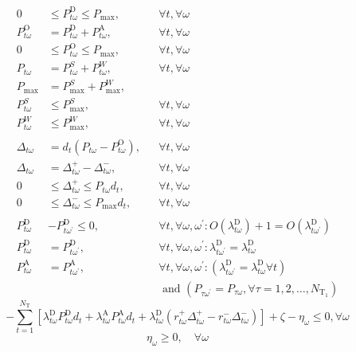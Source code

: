 \begin{align}
0 &\leq P_{t \omega}^{\mathrm{D}} \leq P_{\mathrm{max}}, &  &\forall t, \forall \omega \\
P_{t \omega}^{\mathrm{O}}&=P_{t \omega}^{\mathrm{D}}+P_{t \omega}^{\mathrm{A}},&  &\forall t, \forall \omega \\
0 &\leq P_{t \omega}^{\mathrm{O}} \leq P_{\max }, & & \forall t, \forall \omega \\
P_{t\omega}&= P_{t\omega}^S+P_{t\omega}^W, & &\forall t,\forall \omega \\
P_{\max}&= P^{S}_{\max}+P^{W}_{\max},  \\
P_{t\omega}^{S} &\leq P^{S}_{\max}, &&\forall t, \forall \omega \\
P_{t\omega}^{W} &\leq P^{W}_{\max}, &&\forall t, \forall \omega \\
\nonumber \\
\Delta_{t \omega}&=d_{t}\left(P_{t \omega}-P_{t \omega}^{\mathrm{O}}\right), &&\forall t, \forall \omega \\
\Delta_{t \omega}&=\Delta_{t \omega}^{+}-\Delta_{t \omega}^{-}, &&\forall t, \forall \omega \\
0& \leq \Delta_{t \omega}^{+} \leq P_{t \omega} d_{t}, &&\forall t, \forall \omega \\
0& \leq \Delta_{t \omega}^{-} \leq P_{\max } d_{t}, &&\forall t, \forall \omega \\
\nonumber \\
P_{t \omega}^{\mathrm{D}}&-P_{t \omega^{\prime}}^{\mathrm{D}} \leq 0, && \forall t, \forall \omega, \omega^{\prime}: O\left(\lambda_{t \omega}^{\mathrm{D}}\right)+1=O\left(\lambda_{t \omega^{\prime}}^{\mathrm{D}}\right) \\
P_{t \omega}^{\mathrm{D}}&=P_{t \omega^{\prime}}^{\mathrm{D}}, && \forall t, \forall \omega, \omega^{\prime}: \lambda_{t \omega^{\prime}}^{\mathrm{D}}=\lambda_{t \omega}^{\mathrm{D}} \\
P_{t \omega}^{\mathrm{A}}&=P_{t \omega^{\prime}}^{\mathrm{A}},&& \forall t, \forall \omega, \omega^{\prime}:\left(\lambda_{t \omega^{\prime}}^{\mathrm{D}}=\lambda_{t \omega}^{\mathrm{D}} \forall t\right) \nonumber \\
& &&\text { and } \left(P_{\tau \omega^{\prime}}=P_{\tau \omega}, \forall \tau=1,2, \ldots, N_{\mathrm{T}_{1}}\right) 
\end{align}
\begin{equation}
-\sum_{t=1}^{N_{\mathrm{T}}}\left[\lambda_{t \omega}^{\mathrm{D}} P_{t \omega}^{\mathrm{D}} d_{t}+\lambda_{t \omega}^{\mathrm{A}} P_{t \omega}^{\mathrm{A}} d_{t}+\lambda_{t \omega}^{\mathrm{D}}\left(r_{t \omega}^{+} \Delta_{t \omega}^{+}-r_{t \omega}^{-} \Delta_{t \omega}^{-}\right)\right]+\zeta-\eta_{\omega} \leq 0, \forall \omega
\end{equation}
\begin{equation}
\eta_{\omega} \geq 0, \quad \forall \omega
\end{equation}